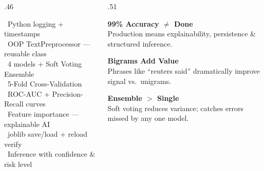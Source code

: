 \documentclass[aspectratio=169,10pt]{beamer}
\begin{document}
\begin{frame}[t]
\begin{columns}[T]
\begin{column}{.46\textwidth}
\begin{tcolorbox}[mycard={BlueMid}{ABlue},title={\footnotesize\textbf{Industrial Additions}},
      colbacktitle=NavyML,coltitle=white]
    \ Python logging + timestamps\\[1pt]
    \ OOP TextPreprocessor --- reusable class\\[1pt]
    \ 4 models + Soft Voting Ensemble\\[1pt]
    \ 5-Fold Cross-Validation\\[1pt]
    \ ROC-AUC + Precision-Recall curves\\[1pt]
    \ Feature importance --- explainable AI\\[1pt]
    \ joblib save/load + reload verify\\[1pt]
    \ Inference with confidence \& risk level
  \end{tcolorbox}
\end{column}
\begin{column}{.51\textwidth}
  \begin{tcolorbox}[mycard={ATeal}{ATeal},title={\footnotesize\textbf{Key Learnings}},
      colbacktitle=ATeal,coltitle=white]
    \begin{tcolorbox}[sideline={ABlue},top=2pt,bottom=-10pt]
      {\footnotesize\textbf{\color{ABlue}99\% Accuracy $\neq$ Done}}\\
      {\tiny\color{Slate}Production means explainability, persistence \& structured inference.}
    \end{tcolorbox}\vspace{2pt}
    \begin{tcolorbox}[sideline={AGreen},top=2pt,bottom=-10pt]
      {\footnotesize\textbf{\color{AGreen}Bigrams Add Value}}\\
      {\tiny\color{Slate}Phrases like ``reuters said'' dramatically improve signal vs.\ unigrams.}
    \end{tcolorbox}\vspace{2pt}
    \begin{tcolorbox}[sideline={AOrange},top=2pt,bottom=-10pt]
      {\footnotesize\textbf{\color{AOrange}Ensemble $>$ Single}}\\
      {\tiny\color{Slate}Soft voting reduces variance; catches errors missed by any one model.}
    \end{tcolorbox}\vspace{2pt}
    \begin{tcolorbox}[sideline={APurple},top=2pt,bottom=2pt]

\end{tcolorbox}
\end{tcolorbox}
\end{column}
\end{columns}
\end{frame}
\end{document}

